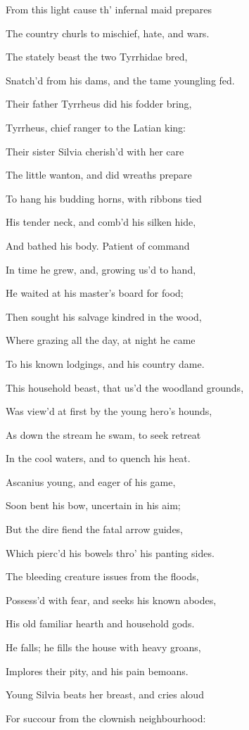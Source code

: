 From this light cause th’ infernal maid prepares

The country churls to mischief, hate, and wars.

The stately beast the two Tyrrhidae bred,

Snatch’d from his dams, and the tame youngling fed.

Their father Tyrrheus did his fodder bring,

Tyrrheus, chief ranger to the Latian king:

Their sister Silvia cherish’d with her care

The little wanton, and did wreaths prepare

To hang his budding horns, with ribbons tied

His tender neck, and comb’d his silken hide,

And bathed his body. Patient of command

In time he grew, and, growing us’d to hand,

He waited at his master’s board for food;

Then sought his salvage kindred in the wood,

Where grazing all the day, at night he came

To his known lodgings, and his country dame.

This household beast, that us’d the woodland grounds,

Was view’d at first by the young hero’s hounds,

As down the stream he swam, to seek retreat

In the cool waters, and to quench his heat.

Ascanius young, and eager of his game,

Soon bent his bow, uncertain in his aim;

But the dire fiend the fatal arrow guides,

Which pierc’d his bowels thro’ his panting sides.

The bleeding creature issues from the floods,

Possess’d with fear, and seeks his known abodes,

His old familiar hearth and household gods.

He falls; he fills the house with heavy groans,

Implores their pity, and his pain bemoans.

Young Silvia beats her breast, and cries aloud

For succour from the clownish neighbourhood:

